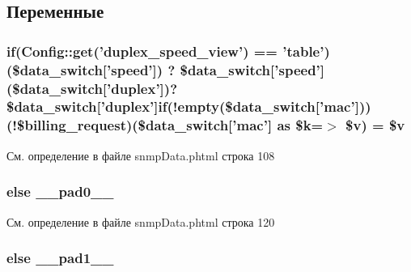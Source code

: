 \subsection{Переменные}
\hypertarget{snmp_data_8phtml_acdc3d14aaf4fe531149c8ceaea738f59}{
\subsubsection[{(!\$billing\-\_\-request)}]{\setlength{\rightskip}{0pt plus 5cm}if({\bf Config\-::get}('duplex\-\_\-speed\-\_\-view') == 'table') (\$data\-\_\-switch\mbox{[}'speed'\mbox{]}) ? \$data\-\_\-switch\mbox{[}'speed'\mbox{]} (\$data\-\_\-switch\mbox{[}'duplex'\mbox{]})?\$data\-\_\-switch\mbox{[}'duplex'\mbox{]}if(!empty(\$data\-\_\-switch\mbox{[}'mac'\mbox{]})) (!\$billing\-\_\-request)(\$data\-\_\-switch\mbox{[}'mac'\mbox{]} as \$k=$>$ \$v) = \$v}}\label{snmp_data_8phtml_acdc3d14aaf4fe531149c8ceaea738f59}


См. определение в файле snmp\-Data.\-phtml строка 108

\hypertarget{snmp_data_8phtml_a8e01dcc96c43199448ee66f7c2ae8ea6}{
\subsubsection[{\-\_\-\-\_\-pad0\-\_\-\-\_\-}]{\setlength{\rightskip}{0pt plus 5cm}else \-\_\-\-\_\-pad0\-\_\-\-\_\-}}\label{snmp_data_8phtml_a8e01dcc96c43199448ee66f7c2ae8ea6}


См. определение в файле snmp\-Data.\-phtml строка 120

\hypertarget{snmp_data_8phtml_ae8b4bb1441c6ab4dcb28a37bc46c8ead}{
\subsubsection[{\-\_\-\-\_\-pad1\-\_\-\-\_\-}]{\setlength{\rightskip}{0pt plus 5cm}else \-\_\-\-\_\-pad1\-\_\-\-\_\-}}\label{snmp_data_8phtml_ae8b4bb1441c6ab4dcb28a37bc46c8ead}



